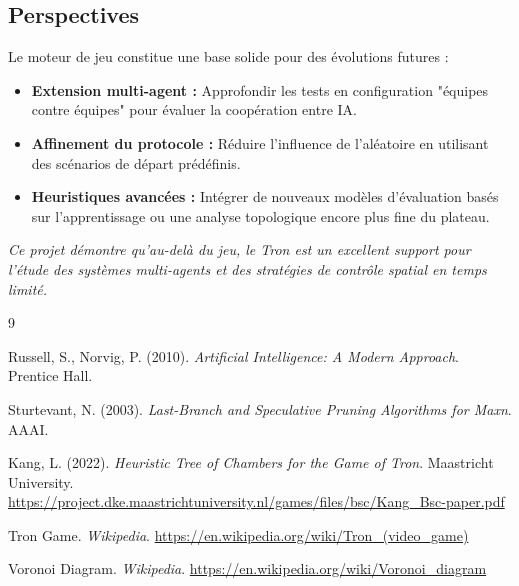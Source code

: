 \documentclass[11pt,a4paper]{article}
\begin{document}
\subsection{Perspectives}
Le moteur de jeu constitue une base solide pour des évolutions futures :
\begin{itemize}
    \item \textbf{Extension multi-agent :} Approfondir les tests en configuration "équipes contre équipes" pour évaluer la coopération entre IA.
    \item \textbf{Affinement du protocole :} Réduire l'influence de l'aléatoire en utilisant des scénarios de départ prédéfinis.
    \item \textbf{Heuristiques avancées :} Intégrer de nouveaux modèles d'évaluation basés sur l'apprentissage ou une analyse topologique encore plus fine du plateau.
\end{itemize}

\vspace{1cm}
\begin{center}
    \textit{Ce projet démontre qu'au-delà du jeu, le Tron est un excellent support pour l'étude des systèmes multi-agents et des stratégies de contrôle spatial en temps limité.}
\end{center}



\clearpage

\begin{thebibliography}{9}

Russell, S., Norvig, P. (2010). \textit{Artificial Intelligence: A Modern Approach}. Prentice Hall.

Sturtevant, N. (2003). \textit{Last-Branch and Speculative Pruning Algorithms for Maxn}. AAAI.

Kang, L. (2022). \textit{Heuristic Tree of Chambers for the Game of Tron}. Maastricht University. \url{https://project.dke.maastrichtuniversity.nl/games/files/bsc/Kang_Bsc-paper.pdf}

Tron Game. \textit{Wikipedia}. \url{https://en.wikipedia.org/wiki/Tron_(video_game)}

Voronoi Diagram. \textit{Wikipedia}. \url{https://en.wikipedia.org/wiki/Voronoi_diagram}

\end{thebibliography}
\end{document}
